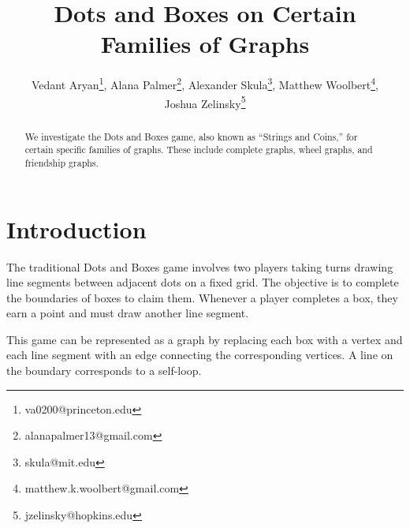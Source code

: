 \documentclass{article}
\title{Dots and Boxes on Certain Families of Graphs}
\author{Vedant Aryan\footnote{va0200@princeton.edu }, Alana Palmer\footnote{alanapalmer13@gmail.com}, Alexander Skula\footnote{skula@mit.edu}, Matthew Woolbert\footnote{ matthew.k.woolbert@gmail.com},\\ Joshua Zelinsky\footnote{jzelinsky@hopkins.edu}}
\date{}
\begin{document}
\maketitle

\begin{abstract}
    We investigate the Dots and Boxes game,  also known as ``Strings and Coins,'' for certain specific families of graphs. These include complete graphs, wheel graphs, and friendship graphs.  
\end{abstract}

\section*{Introduction}

 The traditional Dots and Boxes game involves two players taking turns drawing line segments between adjacent dots on a fixed grid. The objective is to complete the boundaries of boxes to claim them. Whenever a player completes a box, they earn a point and must draw another line segment.
 
 This game can be represented as a graph by replacing each box with a vertex and each line segment with an edge connecting the corresponding vertices. A line on the boundary corresponds to a self-loop.
\end{document}
